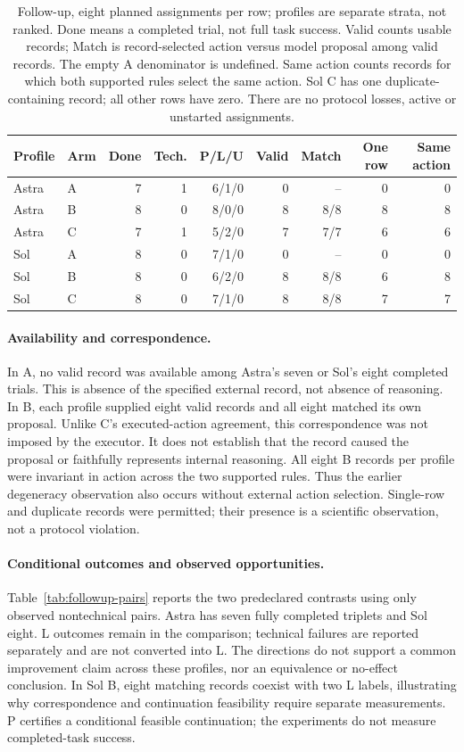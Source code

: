 \begin{table}[htbp]
\centering\small
\begin{tabular}{llrrrrrrr}\toprule
Profile & Arm & Done & Tech. & P/L/U & Valid & Match & One row & Same action\\\midrule
Astra & A & 7 & 1 & 6/1/0 & 0 & -- & 0 & 0\\
Astra & B & 8 & 0 & 8/0/0 & 8 & 8/8 & 8 & 8\\
Astra & C & 7 & 1 & 5/2/0 & 7 & 7/7 & 6 & 6\\\midrule
Sol & A & 8 & 0 & 7/1/0 & 0 & -- & 0 & 0\\
Sol & B & 8 & 0 & 6/2/0 & 8 & 8/8 & 6 & 8\\
Sol & C & 8 & 0 & 7/1/0 & 8 & 8/8 & 7 & 7\\\bottomrule
\end{tabular}
\caption{Follow-up, eight planned assignments per row; profiles are separate
strata, not ranked. Done means a completed trial, not full task success.
Valid counts usable records; Match is record-selected action versus model
proposal among valid records. The empty A denominator is undefined.
Same action counts records for which both supported rules select the same
action. Sol C has one duplicate-containing record; all other rows have zero.
There are no protocol losses, active or unstarted assignments.}
\label{tab:followup-records}
\end{table}

\paragraph{Availability and correspondence.}
In A, no valid record was available among Astra's seven or Sol's eight
completed trials. This is absence of the specified external record, not
absence of reasoning. In B, each profile supplied eight valid records and all
eight matched its own proposal. Unlike C's executed-action agreement, this
correspondence was not imposed by the executor. It does not establish that
the record caused the proposal or faithfully represents internal reasoning.
All eight B records per profile were invariant in action across the two
supported rules. Thus the earlier degeneracy observation also occurs without
external action selection. Single-row and duplicate records were permitted;
their presence is a scientific observation, not a protocol violation.

\paragraph{Conditional outcomes and observed opportunities.}
Table~\ref{tab:followup-pairs} reports the two predeclared contrasts using only
observed nontechnical pairs. Astra has seven fully completed triplets and Sol
eight. L outcomes remain in the comparison; technical failures are reported
separately and are not converted into L. The directions do not support a
common improvement claim across these profiles, nor an equivalence or
no-effect conclusion. In Sol B, eight matching records coexist with two L
labels, illustrating why correspondence and continuation feasibility require
separate measurements. P certifies a conditional feasible continuation;
the experiments do not measure completed-task success.


